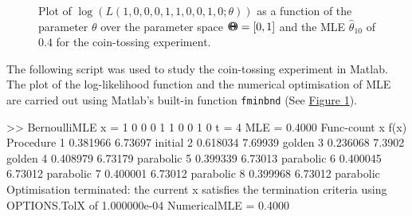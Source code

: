 \begin{figure}[htpb]
\caption{Plot of $\log(L(1,0,0,0,1,1,0,0,1,0;\theta))$ as a function of the parameter $\theta$ over the parameter space ${\Theta}\mspace{-11 mu}{\Theta}=[0,1]$ and the MLE $\widehat{\theta}_{10}$ of $0.4$ for the coin-tossing experiment.\label {F:BernoulliMLE}}
\centering   {}
\end{figure}


\begin{labwork}\label{LW:BernoulliMLE}
The following script was used to study the coin-tossing experiment in {\sc Matlab}.  The plot of the log-likelihood function and the numerical optimisation of MLE are carried out using {\sc Matlab}'s built-in function {\tt fminbnd} (See \hyperref[F:BernoulliMLE]{Figure \ref*{F:BernoulliMLE}}).

{}

\begin{VrbM}
>> BernoulliMLE
x =     1     0     0     0     1     1     0     0     1     0
t =     4
MLE =    0.4000
Func-count     x          f(x)         Procedure
    1       0.381966      6.73697        initial
    2       0.618034      7.69939        golden
    3       0.236068       7.3902        golden
    4       0.408979      6.73179        parabolic
    5       0.399339      6.73013        parabolic
    6       0.400045      6.73012        parabolic
    7       0.400001      6.73012        parabolic
    8       0.399968      6.73012        parabolic
Optimisation terminated:
 the current x satisfies the termination criteria using OPTIONS.TolX of 1.000000e-04 
NumericalMLE =   0.4000
\end{VrbM}
\end{labwork}

